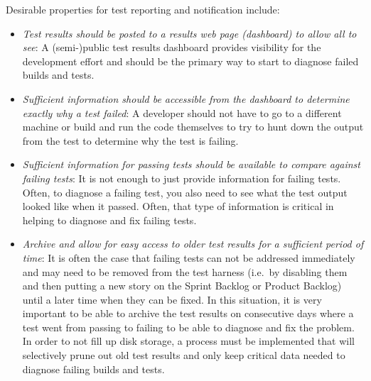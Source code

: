 \documentclass[pdf,ps2pdf,11pt]{SANDreport}
\begin{document}
Desirable properties for test reporting and notification include:

\begin{itemize}

{}\item\textit{Test results should be posted to a results web page
(dashboard) to allow all to see}: A (semi-)public test results
dashboard provides visibility for the development effort and should be
the primary way to start to diagnose failed builds and tests.

{}\item\textit{Sufficient information should be accessible from the
dashboard to determine exactly why a test failed}: A developer should
not have to go to a different machine or build and run the code
themselves to try to hunt down the output from the test to determine
why the test is failing.

{}\item\textit{Sufficient information for passing tests should be
available to compare against failing tests}: It is not enough to just
provide information for failing tests.  Often, to diagnose a failing
test, you also need to see what the test output looked like when it
passed.  Often, that type of information is critical in helping to
diagnose and fix failing tests.

{}\item\textit{Archive and allow for easy access to older test results
for a sufficient period of time}: It is often the case that failing
tests can not be addressed immediately and may need to be removed from
the test harness (i.e.\ by disabling them and then putting a new story
on the Sprint Backlog or Product Backlog) until a later time when they
can be fixed.  In this situation, it is very important to be able to
archive the test results on consecutive days where a test went from
passing to failing to be able to diagnose and fix the problem.  In
order to not fill up disk storage, a process must be implemented that
will selectively prune out old test results and only keep critical
data needed to diagnose failing builds and tests.


\end{itemize}
\end{document}
